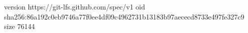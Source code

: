 version https://git-lfs.github.com/spec/v1
oid sha256:86a192c0eb9746a77f0ee4df09c4962731b13183b97aececd8733e497fe327c9
size 76144
